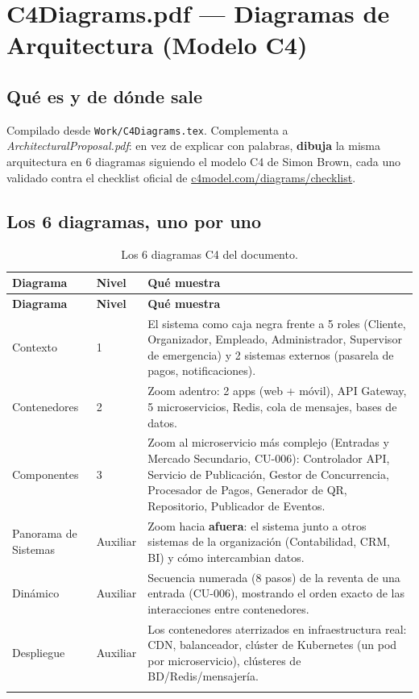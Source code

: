 \documentclass[12pt,a4paper]{article}
\begin{document}
\section{C4Diagrams.pdf --- Diagramas de Arquitectura (Modelo C4)}

\subsection{Qué es y de dónde sale}

Compilado desde \texttt{Work/C4Diagrams.tex}. Complementa a \textit{ArchitecturalProposal.pdf}: en
vez de explicar con palabras, \textbf{dibuja} la misma arquitectura en 6 diagramas siguiendo el
modelo C4 de Simon Brown, cada uno validado contra el checklist oficial de
\href{https://c4model.com/diagrams/checklist}{c4model.com/diagrams/checklist}.

\subsection{Los 6 diagramas, uno por uno}

\begin{longtable}{p{2.6cm}p{2.1cm}p{7.9cm}}
\toprule
\textbf{Diagrama} & \textbf{Nivel} & \textbf{Qué muestra}\\
\midrule
\endfirsthead
\toprule
\textbf{Diagrama} & \textbf{Nivel} & \textbf{Qué muestra}\\
\midrule
\endhead
Contexto & 1 & El sistema como caja negra frente a 5 roles (Cliente, Organizador, Empleado,
Administrador, Supervisor de emergencia) y 2 sistemas externos (pasarela de pagos, notificaciones).\\[0.4em]
Contenedores & 2 & Zoom adentro: 2 apps (web + móvil), API Gateway, 5 microservicios, Redis, cola de
mensajes, bases de datos.\\[0.4em]
Componentes & 3 & Zoom al microservicio más complejo (Entradas y Mercado Secundario, CU-006):
Controlador API, Servicio de Publicación, Gestor de Concurrencia, Procesador de Pagos, Generador de
QR, Repositorio, Publicador de Eventos.\\[0.4em]
Panorama de Sistemas & Auxiliar & Zoom hacia \textbf{afuera}: el sistema junto a otros sistemas de
la organización (Contabilidad, CRM, BI) y cómo intercambian datos.\\[0.4em]
Dinámico & Auxiliar & Secuencia numerada (8 pasos) de la reventa de una entrada (CU-006), mostrando
el orden exacto de las interacciones entre contenedores.\\[0.4em]
Despliegue & Auxiliar & Los contenedores aterrizados en infraestructura real: CDN, balanceador,
clúster de Kubernetes (un pod por microservicio), clústeres de BD/Redis/mensajería.\\
\bottomrule
\caption{Los 6 diagramas C4 del documento.}
\end{longtable}
\end{document}
